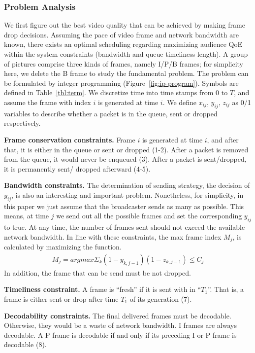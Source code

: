 \subsubsection{Problem Analysis}


We first figure out the best video quality that can be achieved by making frame drop decisions.
Assuming the pace of video frame and network bandwidth are known, there exists an optimal scheduling regarding maximizing audience QoE within the system constraints (bandwidth and queue timeliness length). A group of pictures comprise three kinds of frames, namely I/P/B frames; for simplicity here, we delete the B frame to study the fundamental problem. The problem can be formulated by integer programming (Figure~\ref{fig:ip-program}). Symbols are defined in Table~\ref{tbl:term}. We discretize time into time stamps from $0$ to $T$, and assume the frame with index $i$ is generated at time $i$. We define $x_{ij}$, $y_{ij}$, $z_{ij}$ as 0/1 variables to describe whether a packet is in the queue, sent or dropped respectively.

\textbf{Frame conservation constraints.}
Frame $i$ is generated at time $i$, and after that, it is either in the queue or sent or dropped (1-2).
After a packet is removed from the queue, it would never be enqueued (3).
After a packet is sent/dropped, it is permanently sent/ dropped afterward (4-5).

\textbf{Bandwidth constraints.} 
The determination of sending strategy, the decision of $y_{ij}$, is also an interesting and important problem. Nonetheless, for simplicity, in this paper we just assume that the broadcaster sends as many as possible. This means, at time $j$ we send out all the possible frames and set the corresponding $y_{ij}$ to true. At any time, the number of frames sent should not exceed the available network bandwidth. In line with these constraints, the max frame index $M_{j}$, is calculated by maximizing the function.
\begin{align}
M_j = argmax \Sigma_k (1-y_{k,j-1})(1-z_{k,j-1}) \leq C_{j}
\end{align}
In addition, the frame that can be send must be not dropped.

\textbf{Timeliness constraint.}
A frame is ``fresh'' if it is sent with in ``$T_1$''. That is, a frame is either sent or drop after time $T_1$ of its generation (7).

\textbf{Decodability constraints.} The final delivered frames must be decodable. Otherwise, they would be a waste of network bandwidth. I frames are always decodable. A P frame is decodable if and only if its preceding I or P frame is decodable (8).

